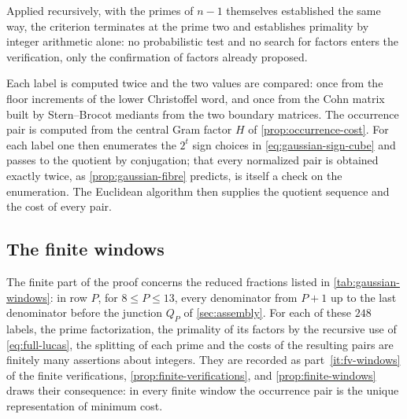Applied recursively, with the primes of $n-1$ themselves established the
same way, the criterion terminates at the prime two and establishes
primality by integer arithmetic alone: no probabilistic test and no search
for factors enters the verification, only the confirmation of factors
already proposed.

Each label is computed twice and the two values are compared: once from
the floor increments of the lower Christoffel word, and once from the Cohn
matrix built by Stern--Brocot mediants from the two boundary matrices. The
occurrence pair is computed from the central Gram factor $H$ of
\cref{prop:occurrence-cost}. For each label one then enumerates the
$2^t$ sign choices in \eqref{eq:gaussian-sign-cube} and passes to the
quotient by conjugation; that every normalized pair is obtained exactly
twice, as \cref{prop:gaussian-fibre} predicts, is itself a check on the
enumeration. The Euclidean algorithm then supplies the quotient sequence
and the cost of every pair.

\subsection{The finite windows}

The finite part of the proof concerns the reduced fractions listed in
\cref{tab:gaussian-windows}: in row $P$, for $8\leqslant P\leqslant13$, every
denominator from $P+1$ up to the last denominator before the junction
$Q_P$ of \cref{sec:assembly}. For each of these $248$ labels, the prime
factorization, the primality of its factors by the recursive use of
\eqref{eq:full-lucas}, the splitting of each prime and the costs of the
resulting pairs are finitely many assertions about integers. They are
recorded as part~\ref{it:fv-windows} of the finite verifications,
\cref{prop:finite-verifications}, and \cref{prop:finite-windows} draws
their consequence: in every finite window the occurrence pair is the unique
representation of minimum cost.

